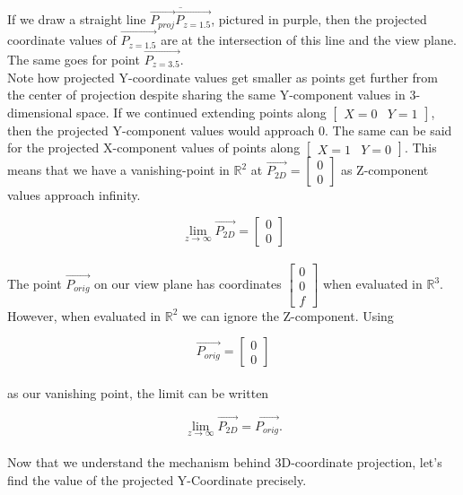 \documentclass[11.pt]{article}
\begin{document}
If we draw a straight line $\overline{\vec{P_{proj}}\vec{P_{z=1.5}}}$,
pictured in purple, then the projected coordinate values of $\vec{P_{z=1.5}}$ 
are at the intersection of this line and the view plane. The same goes for point
$\vec{P_{z=3.5}}$.\\

Note how projected Y-coordinate values get smaller as points get further from the
center of projection despite sharing the same Y-component values in 3-dimensional
space. If we continued extending points along $\begin{bmatrix} X=0 & Y=1 \end{bmatrix}$,
then the projected Y-component values would approach 0. The same can be said for the 
projected X-component values of points along $\begin{bmatrix} X=1 & Y=0 \end{bmatrix}$.
This means that we have a vanishing-point in $\mathbb{R}^2$ at 
$\vec{P_{2D}} = \begin{bmatrix} 0\\ 0\end{bmatrix}$ as Z-component values approach
infinity.

$$\lim_{z \to \infty} \vec{P_{2D}} = \begin{bmatrix} 0\\ 0\end{bmatrix}$$\\

The point $\vec{P_{orig}}$ on our view plane has coordinates 
$\begin{bmatrix} 0\\ 0\\ f\end{bmatrix}$ when evaluated in $\mathbb{R}^3$. However,
when evaluated in $\mathbb{R}^2$ we can ignore the Z-component. Using

$$\vec{P_{orig}} = \begin{bmatrix} 0\\ 0\end{bmatrix}$$\\

as our vanishing point, the limit can be written

$$\lim_{z \to \infty} \vec{P_{2D}} = \vec{P_{orig}}\text{.}$$\\

Now that we understand the mechanism behind 3D-coordinate projection, let's find
the value of the projected Y-Coordinate precisely.\\
\end{document}

